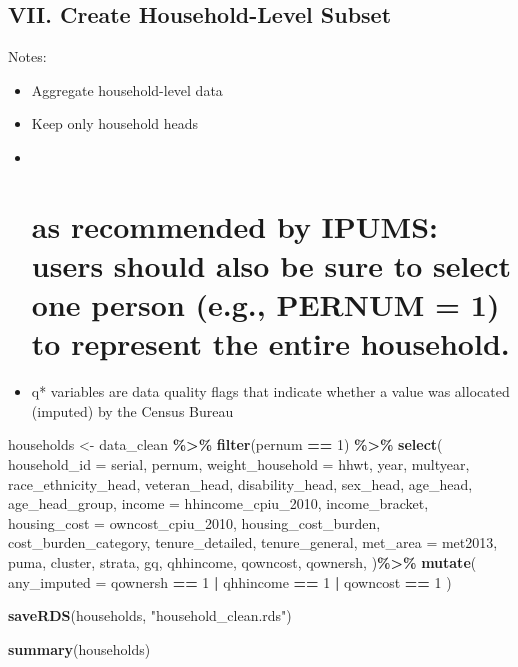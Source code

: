 \documentclass[
]{article}
\newenvironment{Shaded}{\begin{snugshade}}{\end{snugshade}}
\newcommand{\AttributeTok}[1]{\textcolor[rgb]{0.13,0.29,0.53}{#1}}
\newcommand{\DecValTok}[1]{\textcolor[rgb]{0.00,0.00,0.81}{#1}}
\newcommand{\FunctionTok}[1]{\textcolor[rgb]{0.13,0.29,0.53}{\textbf{#1}}}
\newcommand{\NormalTok}[1]{#1}
\newcommand{\OtherTok}[1]{\textcolor[rgb]{0.56,0.35,0.01}{#1}}
\newcommand{\SpecialCharTok}[1]{\textcolor[rgb]{0.81,0.36,0.00}{\textbf{#1}}}
\newcommand{\StringTok}[1]{\textcolor[rgb]{0.31,0.60,0.02}{#1}}
\begin{document}
\subsection{VII. Create Household-Level
Subset}\label{vii.-create-household-level-subset}

Notes:

\begin{itemize}
\item
  Aggregate household-level data
\item
  Keep only household heads
\item ~
  \section{as recommended by IPUMS: users should also be sure to select
  one person (e.g., PERNUM = 1) to represent the entire
  household.}\label{as-recommended-by-ipums-users-should-also-be-sure-to-select-one-person-e.g.-pernum-1-to-represent-the-entire-household.}
\item
  q* variables are data quality flags that indicate whether a value was
  allocated (imputed) by the Census Bureau
\end{itemize}

\begin{Shaded}
\begin{Highlighting}[]
\NormalTok{households }\OtherTok{\textless{}{-}}\NormalTok{ data\_clean }\SpecialCharTok{\%\textgreater{}\%}
  \FunctionTok{filter}\NormalTok{(pernum }\SpecialCharTok{==} \DecValTok{1}\NormalTok{) }\SpecialCharTok{\%\textgreater{}\%}  
  \FunctionTok{select}\NormalTok{(}
    \AttributeTok{household\_id =}\NormalTok{ serial,}
\NormalTok{    pernum,}
    \AttributeTok{weight\_household =}\NormalTok{ hhwt,}
\NormalTok{    year, }
\NormalTok{    multyear,}
\NormalTok{    race\_ethnicity\_head,}
\NormalTok{    veteran\_head,}
\NormalTok{    disability\_head,}
\NormalTok{    sex\_head,}
\NormalTok{    age\_head,}
\NormalTok{    age\_head\_group,}
    \AttributeTok{income =}\NormalTok{ hhincome\_cpiu\_2010,}
\NormalTok{    income\_bracket,}
    \AttributeTok{housing\_cost =}\NormalTok{ owncost\_cpiu\_2010,}
\NormalTok{    housing\_cost\_burden,}
\NormalTok{    cost\_burden\_category,}
\NormalTok{    tenure\_detailed,}
\NormalTok{    tenure\_general,}
    \AttributeTok{met\_area =}\NormalTok{ met2013, }
\NormalTok{    puma, }
\NormalTok{    cluster,}
\NormalTok{    strata,}
\NormalTok{    gq,}
\NormalTok{    qhhincome, }
\NormalTok{    qowncost, }
\NormalTok{    qownersh,}
\NormalTok{  )}\SpecialCharTok{\%\textgreater{}\%} 
  \FunctionTok{mutate}\NormalTok{(}
    \AttributeTok{any\_imputed =}\NormalTok{ qownersh }\SpecialCharTok{==} \DecValTok{1} \SpecialCharTok{|}\NormalTok{ qhhincome }\SpecialCharTok{==} \DecValTok{1} \SpecialCharTok{|}\NormalTok{ qowncost }\SpecialCharTok{==} \DecValTok{1} 
\NormalTok{  )}

\FunctionTok{saveRDS}\NormalTok{(households, }\StringTok{"household\_clean.rds"}\NormalTok{)}

\FunctionTok{summary}\NormalTok{(households)}
\end{Highlighting}
\end{Shaded}
\end{document}

